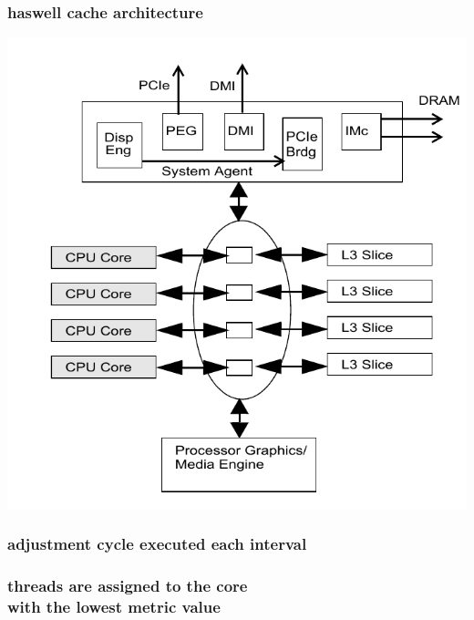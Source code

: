 \documentclass[utf8,10pt]{beamer}
\begin{document}
\begin{frame}
  \frametitle{haswell cache architecture}
  \centering
  \begin{minipage}[l]{.49\columnwidth}
    
  \end{minipage}
  \begin{minipage}[r]{.49\columnwidth}
    \includegraphics[scale=.27]{../haswell_architecture_by_intel_large_cropped}
  \end{minipage}
\end{frame}

\begin{frame}
  \frametitle{adjustment cycle executed each interval}
  \centering
  
\end{frame}


\begin{frame}
  \frametitle{threads are assigned to the core \\ with the lowest metric value}
  \centering
  
\end{frame}
\end{document}
